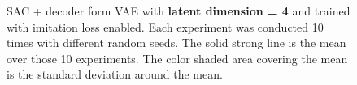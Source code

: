 \begin{figure}
    \begin{center}
        \hfill
    \end{center}
    \caption[SAC + VAE on latent dim = 4]{SAC + decoder form VAE with \textbf{latent dimension = 4} and trained with imitation loss enabled. Each experiment was conducted 10 times with different random seeds. The solid strong line is the mean over those 10 experiments. The color shaded area covering the mean is the standard deviation around the mean.}
    \label{fig:SAC_latent_8}
\end{figure}

